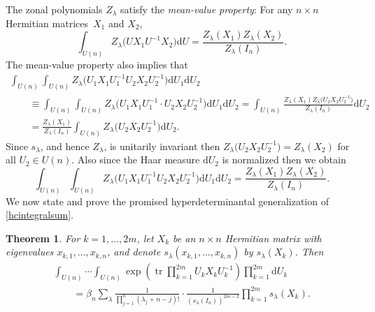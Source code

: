 \documentclass[pdftex]{sigma}
\numberwithin{equation}{section}
\newtheorem{Theorem}{Theorem}[section]
\def\dd{ \mathrm{d}}
\def\tr{\operatorname{tr} }
\begin{document}
The zonal polynomials $Z_\lambda$ satisfy the {\it mean-value property}: For any $n \times n$ Hermitian matrices~$X_1$ and $X_2$,
\begin{equation}
\int_{U(n)} Z_\lambda\bigl(UX_1U^{-1}X_2\bigr) \dd U = \frac{Z_\lambda(X_1) Z_\lambda(X_2)}{Z_\lambda(I_n)}.\label{meanvalue}
\end{equation}
The mean-value property also implies that
\begin{gather*}
\int_{U(n)} \int_{U(n)} Z_\lambda\bigl(U_1 X_1 U_1^{-1} U_2 X_2 U_2^{-1}\bigr) \dd U_1 \dd U_2 \\
\qquad\equiv \int_{U(n)} \int_{U(n)} Z_\lambda\bigl(U_1 X_1 U_1^{-1} \cdot U_2 X_2 U_2^{-1}\bigr) \dd U_1 \dd U_2 = \int_{U(n)} \frac{Z_\lambda(X_1) Z_\lambda\bigl(U_2 X_2 U_2^{-1}\bigr)}{Z_\lambda(I_n)} \dd U_2 \\
\qquad= \frac{Z_\lambda(X_1)}{Z_\lambda(I_n)} \int_{U(n)} Z_\lambda\bigl(U_2 X_2 U_2^{-1}\bigr) \dd U_2.
\end{gather*}
Since $s_\lambda$, and hence $Z_\lambda$, is unitarily invariant then $Z_\lambda\bigl(U_2 X_2 U_2^{-1}\bigr) = Z_\lambda(X_2)$ for all $U_2 \in U(n)$. Also since the Haar measure $\dd U_2$ is normalized then we obtain
\begin{equation}
\int_{U(n)} \int_{U(n)} Z_\lambda\bigl(U_1 X_1 U_1^{-1} U_2 X_2 U_2^{-1}\bigr) \dd U_1 \dd U_2 = \frac{Z_\lambda(X_1) Z_\lambda(X_2)}{Z_\lambda(I_n)}.\label{eq_iterated_mvp}
\end{equation}
We now state and prove the promised hyperdeterminantal generalization of \eqref{hcintegralsum}.

\begin{Theorem}
\label{thm_extd_hc}
For $k=1,\dots,2m$, let $X_k$ be an $n \times n$ Hermitian matrix with eigenvalues $x_{k,1},\dots,x_{k,n}$, and denote $s_\lambda(x_{k,1},\dots,x_{k,n})$ by $s_\lambda(X_k)$. Then
\begin{gather}
\int_{U(n)} \cdots \int_{U(n)} \exp\left(\tr \prod_{k=1}^{2m} U_k X_k U_k^{-1}\right) \prod_{k=1}^{2m} \dd U_k \nonumber\\
\qquad= \beta_n \sum_\lambda \frac{1}{\prod_{j=1}^n (\lambda_j + n-j)!} \cdot \frac{1}{(s_\lambda(I_n))^{2m-2}} \prod_{k=1}^{2m} s_\lambda(X_k).\label{hcextended}
\end{gather}
\end{Theorem}
\end{document}
